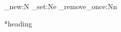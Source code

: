 


\errorstopmode

\pagestyle{empty}


\ExplSyntaxOn
\str_new:N \TestCommandName
\str_set:Ne \TestCommandName {\jobname}
\str_remove_once:Nn 
\ExplSyntaxOff


\START

\UseName{\TestCommandName}*{heading}


